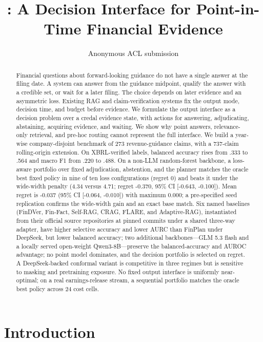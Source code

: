 \documentclass[11pt]{article}
\title{\method: A Decision Interface for Point-in-Time Financial Evidence}
\author{Anonymous ACL submission}
\begin{document}
\sloppy
\maketitle

\begin{abstract}
Financial questions about forward-looking guidance do not have a single answer at the filing date. A system can answer from the guidance midpoint, qualify the answer with a credible set, or wait for a later filing. The choice depends on later evidence and an asymmetric loss. Existing RAG and claim-verification systems fix the output mode, decision time, and budget before evidence. We formulate the output interface as a decision problem over a credal evidence state, with actions for answering, adjudicating, abstaining, acquiring evidence, and waiting. We show why point answers, relevance-only retrieval, and pre-hoc routing cannot represent the full interface. We build a year-wise company-disjoint benchmark of 273 revenue-guidance claims, with a 737-claim rolling-origin extension. On XBRL-verified labels, balanced accuracy rises from .333 to .564 and macro F1 from .220 to .488. On a non-LLM random-forest backbone, a loss-aware portfolio over fixed adjudication, abstention, and the planner matches the oracle best fixed policy in nine of ten loss configurations (regret 0) and beats it under the wide-width penalty (4.34 versus 4.71; regret -0.370, 95\% CI [-0.643, -0.100]). Mean regret is -0.037 (95\% CI [-0.064, -0.010]) with maximum 0.000; a pre-specified seed replication confirms the wide-width gain and an exact base match. Six named baselines (FinDVer, Fin-Fact, Self-RAG, CRAG, FLARE, and Adaptive-RAG), instantiated from their official source repositories at pinned commits under a shared three-way adapter, have higher selective accuracy and lower AURC than FinPlan under DeepSeek, but lower balanced accuracy; two additional backbones---GLM 5.3 flash and a locally served open-weight Qwen3-8B---preserve the balanced-accuracy and AUROC advantage; no point model dominates, and the decision portfolio is selected on regret. A DeepSeek-backed conformal variant is competitive in three regimes but is sensitive to masking and pretraining exposure. No fixed output interface is uniformly near-optimal; on a real earnings-release stream, a sequential portfolio matches the oracle best policy across 24 cost cells.
\end{abstract}

\section{Introduction}
\end{document}
